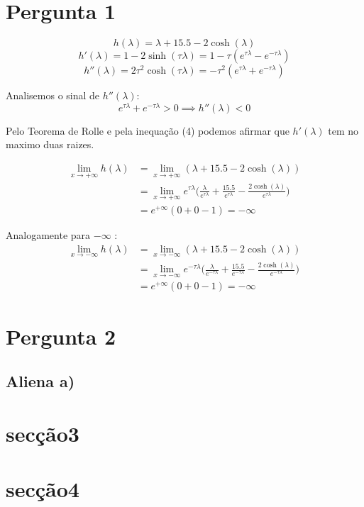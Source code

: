\documentclass[12pt]{article}
\begin{document}


\section{Pergunta 1}
\begin{equation}
	h(\lambda) = \lambda + 15.5 - 2\cosh(\lambda)
\end{equation}
\begin{equation}
	h'(\lambda) = 1 - 2\sinh(\tau\lambda) = 1 - \tau(e^{\tau\lambda} - e^{-\tau\lambda})
\end{equation}
\begin{equation}
	h''(\lambda) = 2\tau^2\cosh(\tau\lambda) = -\tau^2(e^{\tau\lambda} + e^{-\tau\lambda})
\end{equation}

Analisemos o sinal de $h''(\lambda)$:
\begin{equation}
	e^{\tau\lambda} + e^{-\tau\lambda} > 0 \implies h''(\lambda) < 0
\end{equation}

Pelo Teorema de Rolle e pela inequação (4) podemos afirmar que
$h'(\lambda)$ tem no maximo duas raizes.

\begin{equation}
\begin{split}
	\lim_{x \to +\infty} h(\lambda)
	&= \lim_{x \to +\infty} (\lambda + 15.5 - 2\cosh(\lambda)) \\
	&= \lim_{x \to +\infty} e^{\tau\lambda} \bigg(\frac{\lambda}{e^{\tau\lambda}} + \frac{15.5}{e^{\tau\lambda}} - \frac{2\cosh(\lambda)}{e^{\tau\lambda}}\bigg) \\
	&= e^{+\infty} (0 + 0 - 1) = -\infty
\end{split}
\end{equation}

Analogamente para  $-\infty$ :
\begin{equation}
\begin{split}
	\lim_{x \to -\infty} h(\lambda)
	&= \lim_{x \to -\infty} (\lambda + 15.5 - 2\cosh(\lambda)) \\
	&= \lim_{x \to -\infty} e^{-\tau\lambda} \bigg(\frac{\lambda}{e^{-\tau\lambda}} + \frac{15.5}{e^{-\tau\lambda}} - \frac{2\cosh(\lambda)}{e^{-\tau\lambda}}\bigg) \\
	&= e^{+\infty} (0 + 0 - 1) = -\infty
\end{split}
\end{equation}

\section{Pergunta 2}
\subsection{Aliena a)}

\section{secção3}

\section{secção4}
\end{document}
